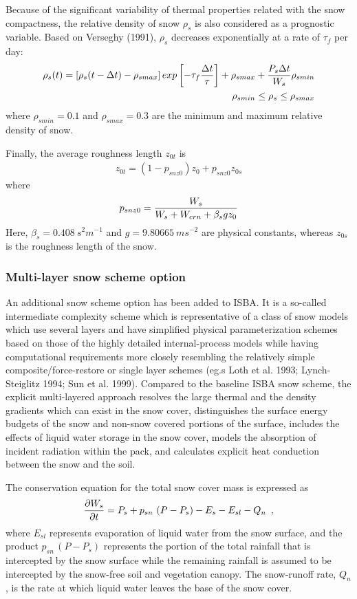 Because of the significant variability of thermal properties related
with the snow compactness,
the relative density of snow $\rho_s$ is also considered
 as a prognostic variable.
Based on Verseghy (1991), $\rho_s$ decreases exponentially at a rate
of $\tau_f$ per day:
\begin{eqnarray}
\rho_s(t)=\left[ \rho_s(t-\Delta t) - \rho_{smax} \right]
exp \left[ -\tau_f {\Delta t \over \tau } \right] + \rho_{smax}
+ {P_s \Delta t \over W_s} \rho_{smin}  \\
\rho_{smin} \leq \rho_s \leq  \rho_{smax}
\end{eqnarray}
where
$\rho_{smin} = 0.1$ and $\rho_{smax} = 0.3$
are the minimum and maximum relative density of snow.

Finally, the average roughness length $z_{0t}$ is
\begin{eqnarray}
z_{0t} = ( 1 - p_{snz0} ) z_0 + p_{snz0} z_{0s}
\end{eqnarray}
where
\begin{eqnarray}
p_{snz0} = { W_s \over W_s + W_{crn} + \beta_s g z_0 }
\end{eqnarray}
Here, $\beta_s = 0.408 \ s^2 m^{-1}$ and $g=9.80665 \ m s^{-2}$ are physical constants,
whereas $z_{0s}$ is the roughness length of the snow.

\subsubsection{Multi-layer snow scheme option}

An additional snow scheme option has been added to ISBA.
It is a so-called intermediate complexity scheme which
is representative of a class of snow models which
use several layers and have simplified physical parameterization schemes
based on those of the highly detailed internal-process models
while having computational requirements more closely resembling
the relatively simple
composite/force-restore or single layer schemes
(eg.s Loth et al. 1993; Lynch-Steiglitz 1994; Sun et al. 1999).
%
Compared to the baseline ISBA snow scheme,
the explicit multi-layered approach
resolves the large thermal and the density gradients
which can exist in the snow cover, distinguishes the surface
energy budgets of the snow and non-snow covered portions
of the surface, includes the effects of liquid water storage
in the snow cover, models the
absorption of incident radiation within the pack,
and calculates explicit heat conduction between the
snow and the soil.

The conservation equation for the total snow cover mass
is expressed as
%
\begin{eqnarray}
{\partial W_s \over \partial t} =
P_s + p_{sn}\,\left(P-P_s\right) - E_{s} - E_{sl} - Q_n
\,\,\,,
\end{eqnarray}
%
where $E_{sl}$ represents evaporation of liquid water
from the snow surface, and the product $p_{sn}\,\left(P-P_s\right)$
represents the portion of the total rainfall that is
intercepted by the snow surface while the remaining
rainfall is assumed to be intercepted by the snow-free soil and vegetation
canopy. The snow-runoff rate, $Q_n$,
is the rate at which
liquid water leaves the base of the snow cover.

